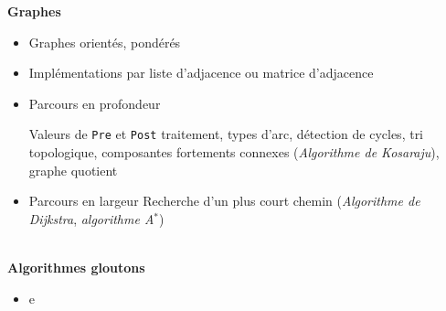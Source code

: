 \documentclass[10pt,a4paper]{article}
\newcommand{\cat}[1]{\noindent \textbf{\Large #1}}
\begin{document}
\cat{Graphes}

%
\begin{itemize}[noitemsep]
	\item Graphes orientés, pondérés
	\item Implémentations par liste d'adjacence ou matrice d'adjacence
	\item Parcours en profondeur
	
		Valeurs de \texttt{Pre} et \texttt{Post} traitement, types d'arc, détection de cycles, tri topologique, composantes fortements connexes (\emph{Algorithme de Kosaraju}), graphe quotient
	\item Parcours en largeur
		Recherche d'un plus court chemin (\emph{Algorithme de Dijkstra}, \emph{algorithme A\(^*\)})
\end{itemize}
%
~ \\


\cat{Algorithmes gloutons}

\begin{itemize}[noitemsep]
	\item e
\end{itemize}
\end{document}
